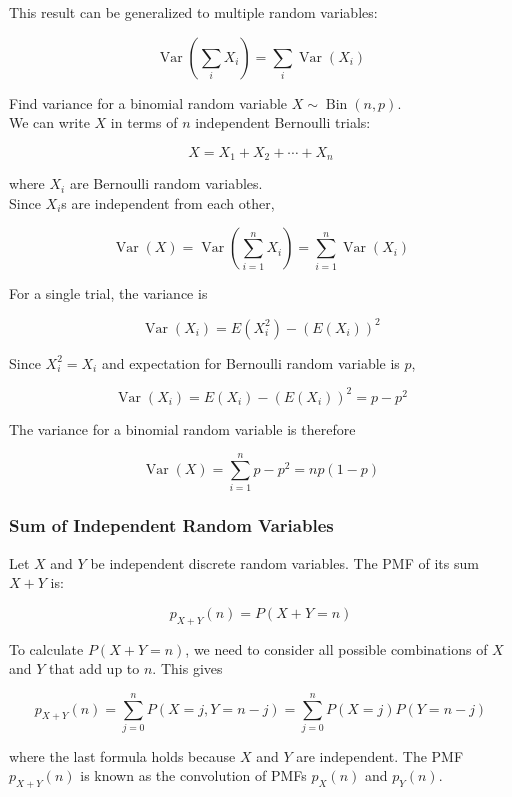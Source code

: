 \documentclass[12pt, a4paper]{article}
\newcounter{exa}
\newcommand{\Var}{\operatorname{Var}}
\newcommand{\Bin}{\operatorname{Bin}}
\begin{document}
This result can be generalized to multiple random variables:

\[\Var\left( \sum_i X_i \right) = \sum_i \Var(X_i)\]

\begin{texample}
Find variance for a binomial random variable $X\sim\Bin(n,p)$. \\

We can write $X$ in terms of $n$ independent Bernoulli trials:

\[X=X_1+X_2+\cdots+X_n\]

where $X_i$ are Bernoulli random variables. \\

Since $X_i$s are independent from each other,

\[\Var(X)=\Var\left( \sum_{i=1}^n X_i \right) = \sum_{i=1}^n \Var(X_i)\]

For a single trial, the variance is

\[\Var(X_i)=E(X_i^2)-(E(X_i))^2\]

Since $X_i^2=X_i$ and expectation for Bernoulli random variable is $p$,

\[\Var(X_i)=E(X_i)-(E(X_i))^2=p-p^2\]

The variance for a binomial random variable is therefore

\[\Var(X) = \sum_{i=1}^n p-p^2 = np(1-p)\]
\end{texample}

\subsubsection{Sum of Independent Random Variables}

Let $X$ and $Y$ be independent discrete random variables. The PMF of its sum $X+Y$ is:

\[p_{X+Y}(n)=P(X+Y=n)\]

To calculate $P(X+Y=n)$, we need to consider all possible combinations of $X$ and $Y$ that add up to $n$. This gives

\[p_{X+Y}(n)=\sum_{j=0}^n P(X=j,Y=n-j)=\sum_{j=0}^n P(X=j)P(Y=n-j)\]

where the last formula holds because $X$ and $Y$ are independent. The PMF $p_{X+Y}(n)$ is known as the convolution of PMFs $p_X(n)$ and $p_Y(n)$.
\end{document}

